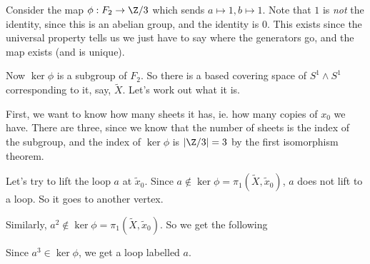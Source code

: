 \documentclass[a4paper]{article}
\begin{document}
\begin{eg}
  Consider the map $\phi: F_2 \to \Z/3$ which sends $a \mapsto 1, b \mapsto 1$. Note that $1$ is \emph{not} the identity, since this is an abelian group, and the identity is $0$. This exists since the universal property tells us we just have to say where the generators go, and the map exists (and is unique).

  Now $\ker\phi$ is a subgroup of $F_2$. So there is a based covering space of $S^1 \wedge S^1$ corresponding to it, say, $\tilde{X}$. Let's work out what it is.

  First, we want to know how many sheets it has, ie. how many copies of $x_0$ we have. There are three, since we know that the number of sheets is the index of the subgroup, and the index of $\ker \phi$ is $|\Z/3| = 3$ by the first isomorphism theorem.
  \begin{center}
  \end{center}
  Let's try to lift the loop $a$ at $\tilde{x}_0$. Since $a \not\in \ker\phi = \pi_1(\tilde{X}, \tilde{x}_0)$, $a$ does not lift to a loop. So it goes to another vertex.
  \begin{center}
  \end{center}
  Similarly, $a^2 \not\in \ker\phi = \pi_1(\tilde{X}, \tilde{x}_0)$. So we get the following
  \begin{center}
  \end{center}
  Since $a^3 \in \ker \phi$, we get a loop labelled $a$.
  \begin{center}
\end{center}
\end{eg}
\end{document}
